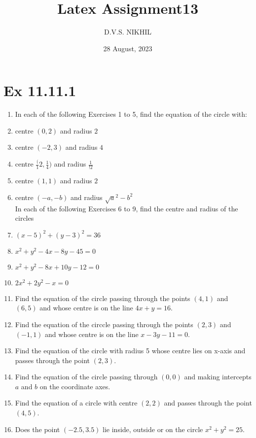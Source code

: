 \documentclass{article}
\theoremstyle{remark}
\begin{document}
\title{Latex Assignment13}
\author{D.V.S. NIKHIL}
\date{28 August, 2023}
\maketitle
\section*{Ex 11.11.1}
\begin{enumerate}
\item In each of the following Exercises 1 to 5, find the equation of the circle with:
\item centre $(0,2)$ and radius $2$
\item centre $(-2,3)$ and radius $4$
\item centre $\frac({1}{2},\frac{1}{4})$ and radius $\frac {1}{!2}$
\item centre $(1,1)$ and radius $2$
\item centre $(-a,-b)$ and radius $\sqrt a^2-b^2$
\\ In each of the following Exercises 6 to 9, find the centre and radius of the circles
\item $(x-5)^2+(y-3)^2=36$
\item $x^2+y^2-4x-8y-45=0$
\item $x^2+y^2-8x+10y-12=0$
\item $2x^2+2y^2-x=0$
\item Find the equation of the circle passing through the points $(4,1)$ and $(6,5)$ and whose centre is on the line $4x+y=16$.
\item Find the equation of the circcle passing through the points $(2,3)$ and $(-1,1)$ and whose centre is on the line $x-3y-11=0$.
\item Find the equation of the circle with radius 5 whose centre lies on x-axis and passes through the point $(2,3)$.
\item Find the equation of the circle passing through $(0,0)$ and making intercepts $a$ and $b$ on the coordinate axes.
\item Find the equation of a circle with centre $(2,2)$ and passes through the point $(4,5)$.
\item Does the point $(-2.5,3.5)$ lie inside, outside or on the circle $x^2+y^2=25$.
\end{enumerate}
\end{document}
